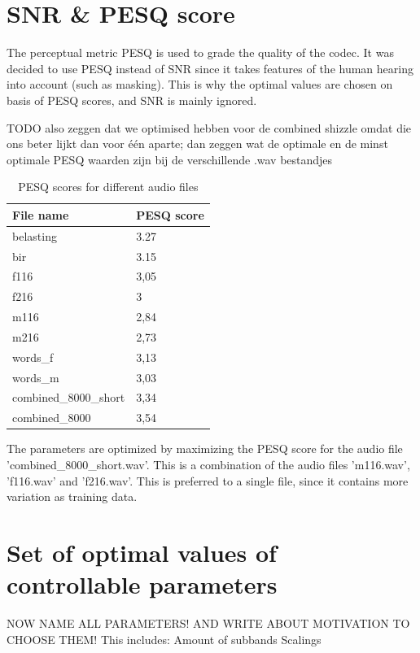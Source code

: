 \documentclass[a4paper]{article}
\begin{document}
\section{SNR \& PESQ score}
The perceptual metric PESQ is used to grade the quality of the codec. It was decided to use PESQ instead of SNR since it takes features of the human hearing into account (such as masking). This is why the optimal values are chosen on basis of PESQ scores, and SNR is mainly ignored.

TODO also zeggen dat we optimised hebben voor de combined shizzle omdat die ons beter lijkt dan voor één aparte; dan zeggen wat de optimale en de minst optimale PESQ waarden zijn bij de verschillende .wav bestandjes

\begin{table}[bth]
\begin{center}
\begin{tabular}{ |l|l| }
  \hline
  File name & PESQ score \\
  \hline
  belasting & 3.27 \\
  bir & 3.15 \\
  f116 & 3,05 \\
  f216 & 3 \\
  m116 & 2,84 \\
  m216 & 2,73 \\
  words\_f & 3,13 \\
  words\_m & 3,03 \\
  combined\_8000\_short & 3,34 \\
  combined\_8000 & 3,54 \\
  \hline
\end{tabular}
  \caption{PESQ scores for different audio files}
\label{fig:pesqscores}
\end{center}
\end{table}

The parameters are optimized by maximizing the PESQ score for the audio file 'combined\_8000\_short.wav'. This is a combination of the audio files 'm116.wav', 'f116.wav' and 'f216.wav'. This is preferred to a single file, since it contains more variation as training data.

\section{Set of optimal values of controllable parameters}
NOW NAME ALL PARAMETERS! AND WRITE ABOUT MOTIVATION TO CHOOSE THEM! This includes:
Amount of subbands
Scalings
\end{document}
